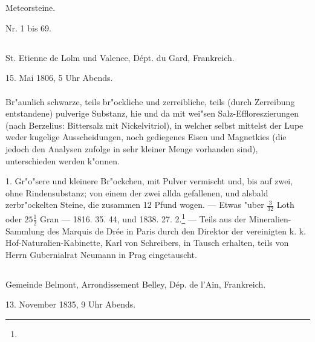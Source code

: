 \documentclass[a4paper, 11pt, oneside, polutonikogreek, german]{article}
\begin{document}
\section{}
\begin{center}
{\LARGE Meteorsteine.}

Nr. 1 bis 69.
\end{center}
\subsection{}
\begin{center}
St. Etienne de Lolm und Valence, Dépt. du Gard, Frankreich.

15. Mai 1806, 5 Uhr Abends.
\end{center}
\paragraph{}
Br"aunlich schwarze, teils br"ockliche und zerreibliche, teils (durch Zerreibung entstandene) pulverige Substanz, hie und da mit wei"sen Salz-Effloreszierungen (nach Berzelius: Bittersalz mit Nickelvitriol), in welcher selbst mittelst der Lupe weder kugelige Ausscheidungen, noch gediegenes Eisen und Magnetkies (die jedoch den Analysen zufolge in sehr kleiner Menge vorhanden sind), unterschieden werden k"onnen.

1. Gr"o"sere und kleinere Br"ockchen, mit Pulver vermischt und, bis auf zwei, ohne Rindensubstanz; von einem der zwei allda gefallenen, und alsbald zerbr"ockelten Steine, die zusammen 12 Pfund wogen. --- Etwas "uber $\frac{3}{32}$ Loth oder $25\frac{1}{2}$ Gran --- 1816. 35. 44, und 1838. 27. 2.\footnote{} --- Teils aus der Mineralien-Sammlung des Marquis de Drée in Paris durch den Direktor der vereinigten k. k. Hof-Naturalien-Kabinette, Karl von Schreibers, in Tausch erhalten, teils von Herrn Gubernialrat Neumann in Prag eingetauscht.
\subsection{}
\begin{center}
Gemeinde Belmont, Arrondissement Belley, Dép. de l’Ain, Frankreich.

13. November 1835, 9 Uhr Abends.
\end{center}
\end{document}
